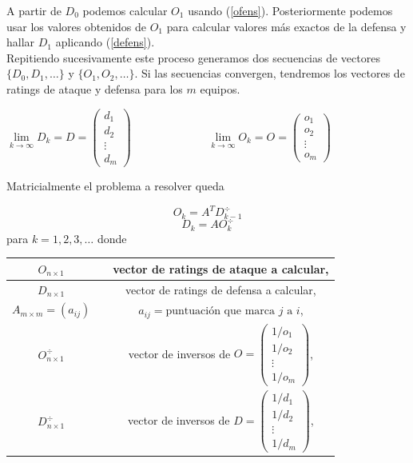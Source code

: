 A partir de $D_{0}$ podemos calcular $O_{1}$ usando (\ref{ofens}). Posteriormente podemos usar los valores obtenidos de $O_{1}$ para calcular valores más exactos de la defensa y hallar $D_{1}$ aplicando (\ref{defens}).\\
Repitiendo sucesivamente este proceso generamos dos secuencias de vectores $\{D_{0},D_{1},\dots\}$ y $\{O_{1},O_{2},\dots\}$. Si las secuencias convergen, tendremos los vectores de ratings de ataque y defensa para los $m$ equipos.
 
\begin{center}
	$
\lim\limits_{k \rightarrow \infty} D_{k} = D = \left(\begin{array}{c}
d_{1}\\
d_{2}\\
\vdots \\
d_{m}
\end{array} \right)$      
\ \ \ \ \ \ \ \ \ \ \ \ \
$
\lim\limits_{k \rightarrow \infty} O_{k} = O = \left(\begin{array}{c}
o_{1}\\
o_{2}\\
\vdots \\
o_{m}
\end{array} \right)$
\end{center}
 

Matricialmente el problema a resolver queda

\begin{equation}
O_{k} = A^{T} D_{k-1}^{\div} \label{ataq}
\end{equation}
\begin{equation}
D_{k} = A O_{k}^{\div} \label{defen}
\end{equation}
para $k=1,2,3,\dots$ donde
\begin{center}
	\begin{tabular}{ccc}
		\hline  $O_{n\times1}$ & & vector de ratings de ataque a calcular, \\
		\hline  $D_{n\times1}$ & & vector de ratings de defensa a calcular, \\
		\hline $A_{m\times m}=(a_{ij})$ & & $a_{ij}=\text{puntuación que marca } j \text{ a } i$,  \\ 
		\hline  $O_{n\times1}^{\div}$ & & vector de inversos de $O = 		\left(\begin{array}{c}
		1/o_{1}\\
		1/o_{2}\\
		\vdots \\
		1/o_{m}
		\end{array} \right)$, \\
		\hline  $D_{n\times1}^{\div}$ & & vector de inversos de $D = 		\left(\begin{array}{c}
		1/d_{1}\\
		1/d_{2}\\
		\vdots \\
		1/d_{m}
		\end{array} \right)$, \\
		\hline 
	\end{tabular}
\end{center} 

